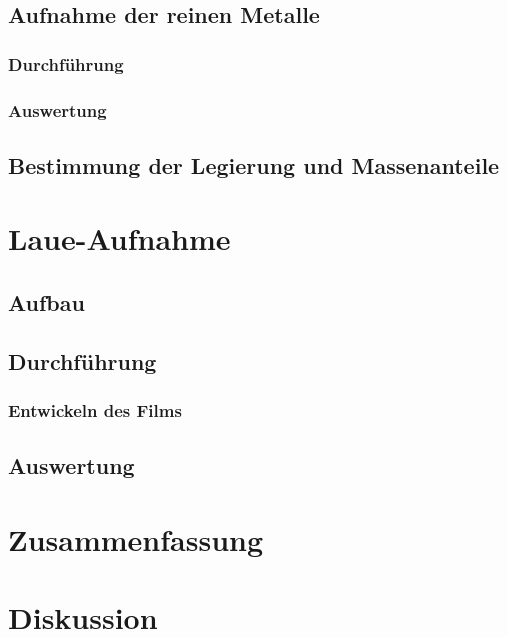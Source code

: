 \section{Aufnahme der reinen Metalle}

\subsection{Durchführung}

\subsection{Auswertung}

\section{Bestimmung der Legierung und Massenanteile}

\chapter{Laue-Aufnahme}

\section{Aufbau}

\section{Durchführung}

\subsection{Entwickeln des Films}

\section{Auswertung}

\chapter{Zusammenfassung}

\chapter{Diskussion}


